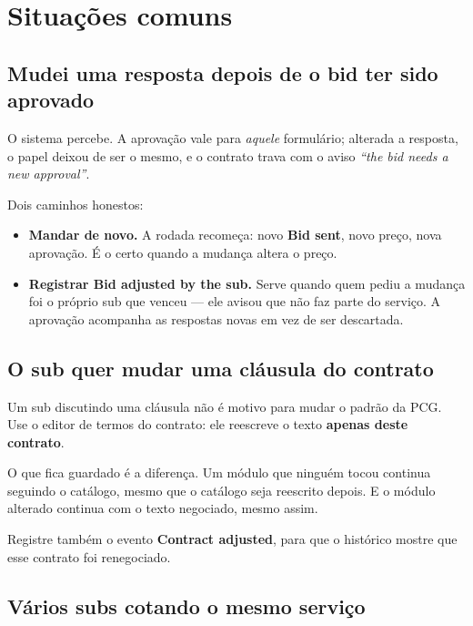 \documentclass[11pt,a4paper]{article}
\newcommand{\ui}[1]{\textbf{\textsf{#1}}}
\begin{document}
\section{Situações comuns}

\subsection{Mudei uma resposta depois de o bid ter sido aprovado}

O sistema percebe. A aprovação vale para \emph{aquele} formulário; alterada a
resposta, o papel deixou de ser o mesmo, e o contrato trava com o aviso
\emph{``the bid needs a new approval''}.

Dois caminhos honestos:

\begin{itemize}
  \item \textbf{Mandar de novo.} A rodada recomeça: novo \ui{Bid sent}, novo
  preço, nova aprovação. É o certo quando a mudança altera o preço.
  \item \textbf{Registrar \ui{Bid adjusted by the sub}.} Serve quando quem pediu a
  mudança foi o próprio sub que venceu — ele avisou que não faz parte do serviço.
  A aprovação acompanha as respostas novas em vez de ser descartada.
\end{itemize}

\subsection{O sub quer mudar uma cláusula do contrato}
\label{sec:ajuste}

Um sub discutindo uma cláusula não é motivo para mudar o padrão da PCG. Use o
editor de termos do contrato: ele reescreve o texto \textbf{apenas deste
contrato}.

O que fica guardado é a diferença. Um módulo que ninguém tocou continua seguindo
o catálogo, mesmo que o catálogo seja reescrito depois. E o módulo alterado
continua com o texto negociado, mesmo assim.

Registre também o evento \ui{Contract adjusted}, para que o histórico mostre que
esse contrato foi renegociado.

\subsection{Vários subs cotando o mesmo serviço}
\end{document}
